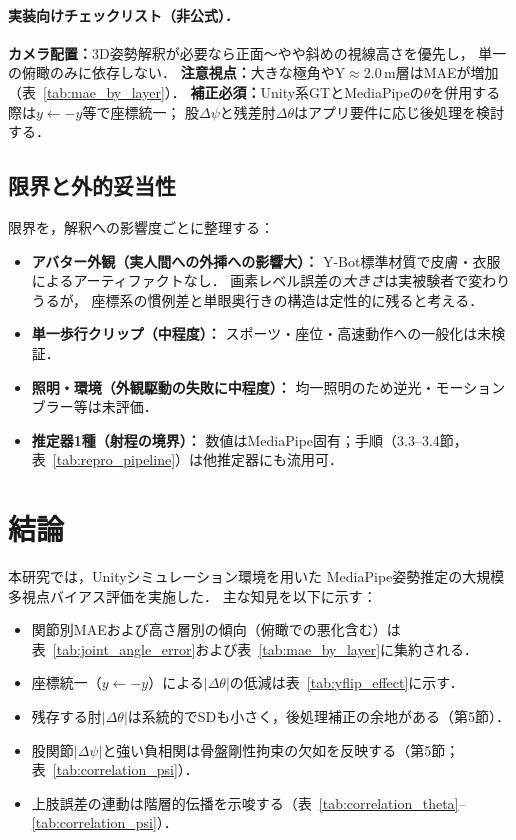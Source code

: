 \documentclass[twocolumn]{article}
\begin{document}
\paragraph{実装向けチェックリスト（非公式）．}
\textbf{カメラ配置：}3D姿勢解釈が必要なら正面～やや斜めの視線高さを優先し，
単一の俯瞰のみに依存しない．
\textbf{注意視点：}大きな極角やY$\approx$2.0\,m層はMAEが増加（表~\ref{tab:mae_by_layer}）．
\textbf{補正必須：}Unity系GTとMediaPipeの$\theta$を併用する際は$y \leftarrow -y$等で座標統一；
股$\Delta\psi$と残差肘$\Delta\theta$はアプリ要件に応じ後処理を検討する．

\subsection{限界と外的妥当性}

限界を，解釈への影響度ごとに整理する：
\begin{itemize}\itemsep2pt
  \item \textbf{アバター外観（実人間への外挿への影響大）：}
        Y-Bot標準材質で皮膚・衣服によるアーティファクトなし．
        画素レベル誤差の\emph{大きさ}は実被験者で変わりうるが，
        座標系の慣例差と単眼奥行きの構造は定性的に残ると考える．
  \item \textbf{単一歩行クリップ（中程度）：}
        スポーツ・座位・高速動作への一般化は未検証．
  \item \textbf{照明・環境（外観駆動の失敗に中程度）：}
        均一照明のため逆光・モーションブラー等は未評価．
  \item \textbf{推定器1種（射程の境界）：}
        数値はMediaPipe固有；手順（3.3--3.4節，表~\ref{tab:repro_pipeline}）は他推定器にも流用可．
\end{itemize}

\section{結論}

本研究では，Unityシミュレーション環境を用いた
MediaPipe姿勢推定の大規模多視点バイアス評価を実施した．
主な知見を以下に示す：

\begin{itemize}\itemsep2pt
  \item 関節別MAEおよび高さ層別の傾向（俯瞰での悪化含む）は
        表~\ref{tab:joint_angle_error}および表~\ref{tab:mae_by_layer}に集約される．
  \item 座標統一（$y \leftarrow -y$）による$|\Delta\theta|$の低減は表~\ref{tab:yflip_effect}に示す．
  \item 残存する肘$|\Delta\theta|$は系統的でSDも小さく，後処理補正の余地がある（第5節）．
  \item 股関節$|\Delta\psi|$と強い負相関は骨盤剛性拘束の欠如を反映する（第5節；表~\ref{tab:correlation_psi}）．
  \item 上肢誤差の連動は階層的伝播を示唆する（表~\ref{tab:correlation_theta}--\ref{tab:correlation_psi}）．
\end{itemize}
\end{document}
